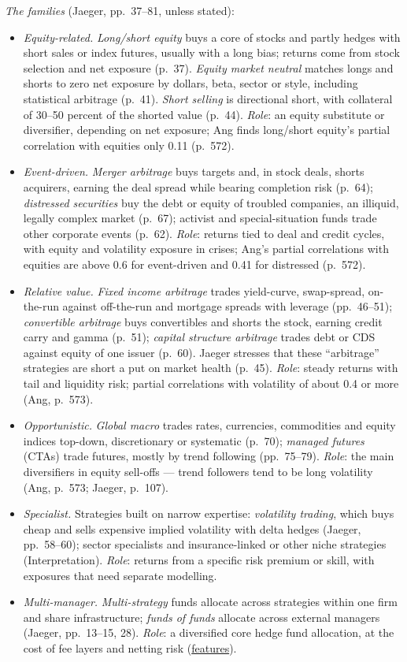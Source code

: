 \begin{qfmethod}
\emph{The families} (Jaeger, pp.~37--81, unless stated):
\begin{itemize}
\item \emph{Equity-related.} \emph{Long/short equity} buys a core of stocks and partly hedges with short sales or index futures, usually with a long bias; returns come from stock selection and net exposure (p.~37). \emph{Equity market neutral} matches longs and shorts to zero net exposure by dollars, beta, sector or style, including statistical arbitrage (p.~41). \emph{Short selling} is directional short, with collateral of 30--50 percent of the shorted value (p.~44). \emph{Role}: an equity substitute or diversifier, depending on net exposure; Ang finds long/short equity's partial correlation with equities only 0.11 (p.~572).
\item \emph{Event-driven.} \emph{Merger arbitrage} buys targets and, in stock deals, shorts acquirers, earning the deal spread while bearing completion risk (p.~64); \emph{distressed securities} buy the debt or equity of troubled companies, an illiquid, legally complex market (p.~67); activist and special-situation funds trade other corporate events (p.~62). \emph{Role}: returns tied to deal and credit cycles, with equity and volatility exposure in crises; Ang's partial correlations with equities are above 0.6 for event-driven and 0.41 for distressed (p.~572).
\item \emph{Relative value.} \emph{Fixed income arbitrage} trades yield-curve, swap-spread, on-the-run against off-the-run and mortgage spreads with leverage (pp.~46--51); \emph{convertible arbitrage} buys convertibles and shorts the stock, earning credit carry and gamma (p.~51); \emph{capital structure arbitrage} trades debt or CDS against equity of one issuer (p.~60). Jaeger stresses that these ``arbitrage'' strategies are short a put on market health (p.~45). \emph{Role}: steady returns with tail and liquidity risk; partial correlations with volatility of about 0.4 or more (Ang, p.~573).
\item \emph{Opportunistic.} \emph{Global macro} trades rates, currencies, commodities and equity indices top-down, discretionary or systematic (p.~70); \emph{managed futures} (CTAs) trade futures, mostly by trend following (pp.~75--79). \emph{Role}: the main diversifiers in equity sell-offs --- trend followers tend to be long volatility (Ang, p.~573; Jaeger, p.~107).
\item \emph{Specialist.} Strategies built on narrow expertise: \emph{volatility trading}, which buys cheap and sells expensive implied volatility with delta hedges (Jaeger, pp.~58--60); sector specialists and insurance-linked or other niche strategies (Interpretation). \emph{Role}: returns from a specific risk premium or skill, with exposures that need separate modelling.
\item \emph{Multi-manager.} \emph{Multi-strategy} funds allocate across strategies within one firm and share infrastructure; \emph{funds of funds} allocate across external managers (Jaeger, pp.~13--15, 28). \emph{Role}: a diversified core hedge fund allocation, at the cost of fee layers and netting risk (\hyperref[def:hedge-fund-features]{features}).
\end{itemize}


\end{qfmethod}
